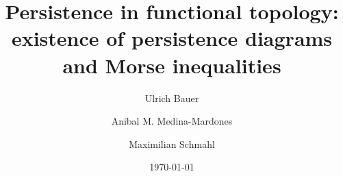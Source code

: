 \documentclass{amsart}
\title[Persistence in functional topology]{Persistence in functional topology:
existence of
persistence diagrams
and
Morse inequalities
}
\author[U.~Bauer]{Ulrich Bauer}
\author[A.~Medina-Mardones]{Anibal M. Medina-Mardones}
\author[M.~Schmahl]{Maximilian Schmahl}
\date{\today}
\begin{document}
	
	\maketitle
	
	
	
	
	
	\appendix
	
	
	\sloppy
	\printbibliography
\end{document}
